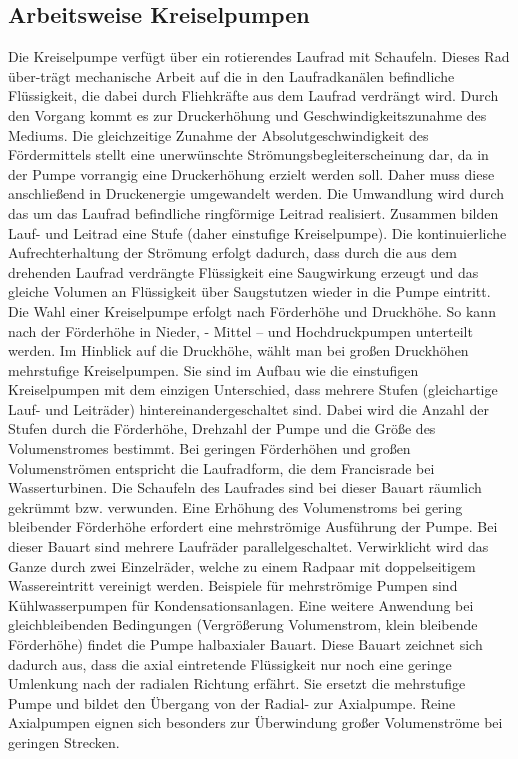 \subsection{Arbeitsweise Kreiselpumpen}
Die Kreiselpumpe verfügt über ein rotierendes Laufrad mit Schaufeln. Dieses Rad über-trägt mechanische Arbeit auf die in den Laufradkanälen befindliche Flüssigkeit, die dabei durch Fliehkräfte aus dem Laufrad verdrängt wird. Durch den Vorgang kommt es zur Druckerhöhung und Geschwindigkeitszunahme des Mediums. Die gleichzeitige Zunahme der Absolutgeschwindigkeit des Fördermittels stellt eine unerwünschte Strömungsbegleiterscheinung dar, da in der Pumpe vorrangig eine Druckerhöhung erzielt werden soll. Daher muss diese anschließend in Druckenergie umgewandelt werden. Die Umwandlung wird durch das um das Laufrad befindliche ringförmige Leitrad realisiert. Zusammen bilden Lauf- und Leitrad eine Stufe (daher einstufige Kreiselpumpe).
Die kontinuierliche Aufrechterhaltung der Strömung erfolgt dadurch, dass durch die aus dem drehenden Laufrad verdrängte Flüssigkeit eine Saugwirkung erzeugt und das gleiche Volumen an Flüssigkeit über Saugstutzen wieder in die Pumpe eintritt. 
Die Wahl einer Kreiselpumpe erfolgt nach Förderhöhe und Druckhöhe. So kann nach der Förderhöhe in Nieder, - Mittel – und Hochdruckpumpen unterteilt werden. Im Hinblick auf die Druckhöhe, wählt man bei großen Druckhöhen mehrstufige Kreiselpumpen. Sie sind im Aufbau wie die einstufigen Kreiselpumpen mit dem einzigen Unterschied, dass mehrere Stufen (gleichartige Lauf- und Leiträder) hintereinandergeschaltet sind. Dabei wird die Anzahl der Stufen durch die Förderhöhe, Drehzahl der Pumpe und die Größe des Volumenstromes bestimmt. 
Bei geringen Förderhöhen und großen Volumenströmen entspricht die Laufradform, die dem Francisrade bei Wasserturbinen. Die Schaufeln des Laufrades sind bei dieser Bauart räumlich gekrümmt bzw. verwunden. Eine Erhöhung des Volumenstroms bei gering bleibender Förderhöhe erfordert eine mehrströmige Ausführung der Pumpe. Bei dieser Bauart sind mehrere Laufräder parallelgeschaltet. Verwirklicht wird das Ganze durch zwei Einzelräder, welche zu einem Radpaar mit doppelseitigem Wassereintritt vereinigt werden. Beispiele für mehrströmige Pumpen sind Kühlwasserpumpen für Kondensationsanlagen. Eine weitere Anwendung bei gleichbleibenden Bedingungen (Vergrößerung Volumenstrom, klein bleibende Förderhöhe) findet die Pumpe halbaxialer Bauart. Diese Bauart zeichnet sich dadurch aus, dass die axial eintretende Flüssigkeit nur noch eine geringe Umlenkung nach der radialen Richtung erfährt. Sie ersetzt die mehrstufige Pumpe und bildet den Übergang von der Radial- zur Axialpumpe. Reine Axialpumpen eignen sich besonders zur Überwindung großer Volumenströme bei geringen Strecken.\cite{Schulz:2013}

